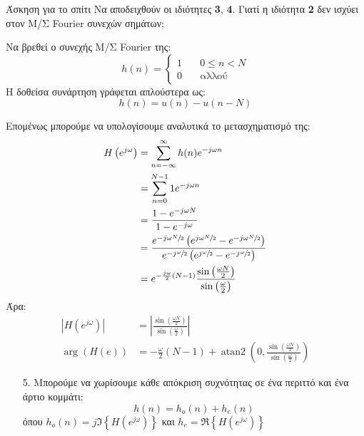 \documentclass[11pt,a4paper,notitlepage,fleqn]{article}
\begin{document}
\begin{questionbox}{Άσκηση για το σπίτι}
	Να αποδειχθούν οι ιδιότητες \textbf{3}, \textbf{4}. Γιατί η ιδιότητα \textbf{2} δεν ισχύει στον Μ/Σ Fourier συνεχών σημάτων;
\end{questionbox}

\begin{exercise}
	Να βρεθεί ο συνεχής Μ/Σ Fourier της:
	\[
	h(n) = \begin{cases}
	1 & \quad 0 \leq n < N\\
	0 & \quad \text{αλλού}
	\end{cases}
	\]
	\tcblower
	Η δοθείσα συνάρτηση γράφεται απλούστερα ως:
	\[
	h(n) = u(n) - u(n-N)
	\]
	
	Επομένως μπορούμε να υπολογίσουμε αναλυτικά το μετασχηματισμό της:
	\begin{align*}
		H\left(e^{j\omega }\right)
		&= \sum_{n=-\infty}^{\infty} h(n) e^{-j\omega n}
		\\ &= \sum_{n=0}^{N-1} 1 e^{-j\omega n}
		\\ &= \frac{1-e^{-j\omega N}}{1-e^{-j\omega }}
		\\ &= \frac
		{
			e^{-j\omega \sfrac{N}{2} } 
			\left(
				e^{j\omega \sfrac{N}{2} }-e^{-j\omega \sfrac{N}{2} }
			\right)
		}
		{ 
			e^{-j\sfrac{\omega }{2} }  
			\left( e^{j\sfrac{\omega }{2}  }
			-e^{-j\sfrac{\omega }{2} 	}\right)
		}
	\\ &= e^{-\frac{j\omega }{2} (N-1)}	\frac{\sin\left(\frac{\omega N}{2}\right)}{\sin\left(\frac{\omega}{2}\right)}
	\end{align*}
	Άρα:
	\begin{align*}
		\left|H\left(e^{j\omega }\right)\right|
		 &= \left|
		\frac{\sin\left(\frac{\omega N}{2}\right)}{\sin\left(\frac{\omega}{2}\right)}
		\right|
		\\
		\arg\left(H\left(e\right)\right) &= -\frac{\omega}{2}(N-1) + \mathop{atan2}\left(0, \frac{\sin\left(\frac{\omega N}{2}\right)}{\sin\left(\frac{\omega}{2}\right)}\right)
	\end{align*}
\end{exercise}

\begin{enumerate}
	\item[5.]
	Μπορούμε να χωρίσουμε κάθε απόκριση συχνότητας σε ένα περιττό και ένα άρτιο κομμάτι:
	\[
	h(n) = h_o(n) + h_e(n)
	\]
	όπου \( h_o(n) = j\Im \left\lbrace H\left(e^{j\omega }\right)\right\rbrace \)
	και \( h_e = \Re\left\lbrace H\left(e^{j\omega }\right) \right\rbrace \)
\end{enumerate}
\end{document}

